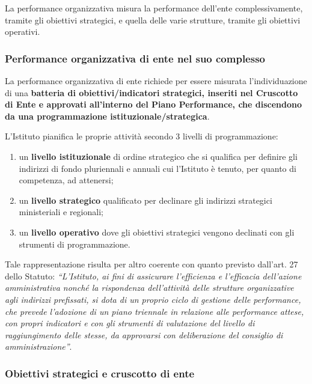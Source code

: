 \documentclass[
  12pt,
]{article}
\begin{document}
La performance organizzativa misura la performance dell'ente
complessivamente, tramite gli obiettivi strategici, e quella delle varie
strutture, tramite gli obiettivi operativi.

\hypertarget{performance-organizzativa-di-ente-nel-suo-complesso}{%
\subsubsection{Performance organizzativa di ente nel suo
complesso}\label{performance-organizzativa-di-ente-nel-suo-complesso}}

La performance organizzativa di ente richiede per essere misurata
l'individuazione di una \textbf{batteria di obiettivi/indicatori
strategici, inseriti nel Cruscotto di Ente e approvati all'interno del
Piano Performance, che discendono da una programmazione
istituzionale/strategica}.

L'Istituto pianifica le proprie attività secondo 3 livelli di
programmazione:

\begin{enumerate}
\def\labelenumi{\alph{enumi})}
\item
  un \textbf{livello istituzionale} di ordine strategico che si
  qualifica per definire gli indirizzi di fondo pluriennali e annuali
  cui l'Istituto è tenuto, per quanto di competenza, ad attenersi;
\item
  un \textbf{livello strategico} qualificato per declinare gli indirizzi
  strategici ministeriali e regionali;
\item
  un \textbf{livello operativo} dove gli obiettivi strategici vengono
  declinati con gli strumenti di programmazione.
\end{enumerate}

Tale rappresentazione risulta per altro coerente con quanto previsto
dall'art. 27 dello Statuto: \emph{``L'Istituto, ai fini di assicurare
l'efficienza e l'efficacia dell'azione amministrativa nonché la
rispondenza dell'attività delle strutture organizzative agli indirizzi
prefissati, si dota di un proprio ciclo di gestione delle performance,
che prevede l'adozione di un piano triennale in relazione alle
performance attese, con propri indicatori e con gli strumenti di
valutazione del livello di raggiungimento delle stesse, da approvarsi
con deliberazione del consiglio di amministrazione''}.

\hypertarget{obiettivi-strategici-e-cruscotto-di-ente}{%
\subsubsection{Obiettivi strategici e cruscotto di
ente}\label{obiettivi-strategici-e-cruscotto-di-ente}}
\end{document}

